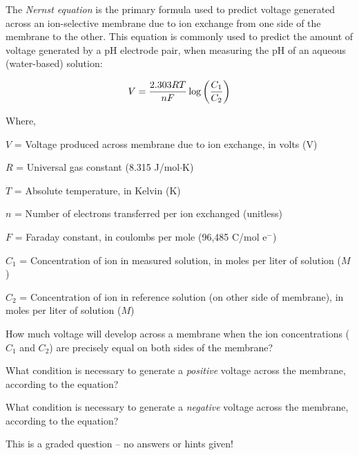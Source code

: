 

The {\it Nernst equation} is the primary formula used to predict voltage generated across an ion-selective membrane due to ion exchange from one side of the membrane to the other.  This equation is commonly used to predict the amount of voltage generated by a pH electrode pair, when measuring the pH of an aqueous (water-based) solution:

$$V = {{2.303 R T} \over {nF}} \log \left({C_1 \over C_2}\right)$$

\noindent
Where,

$V$ = Voltage produced across membrane due to ion exchange, in volts (V)

$R$ = Universal gas constant (8.315 J/mol$\cdot$K)

$T$ = Absolute temperature, in Kelvin (K)

$n$ = Number of electrons transferred per ion exchanged (unitless)

$F$ = Faraday constant, in coulombs per mole (96,485 C/mol e$^{-}$)

$C_1$ = Concentration of ion in measured solution, in moles per liter of solution ($M$)

$C_2$ = Concentration of ion in reference solution (on other side of membrane), in moles per liter of solution ($M$)

\vskip 20pt

How much voltage will develop across a membrane when the ion concentrations ($C_1$ and $C_2$) are precisely equal on both sides of the membrane?

\vskip 20pt

What condition is necessary to generate a {\it positive} voltage across the membrane, according to the equation?

\vskip 20pt

What condition is necessary to generate a {\it negative} voltage across the membrane, according to the equation?

\vfil 

\eject






This is a graded question -- no answers or hints given!


